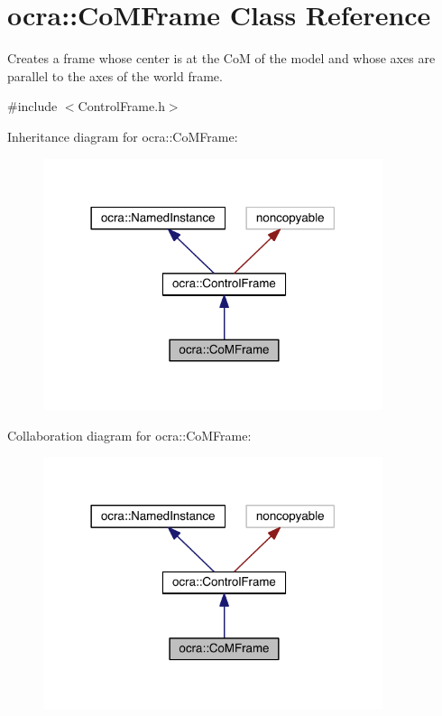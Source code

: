 \hypertarget{classocra_1_1CoMFrame}{}\section{ocra\+:\+:Co\+M\+Frame Class Reference}
\label{classocra_1_1CoMFrame}


Creates a frame whose center is at the CoM of the model and whose axes are parallel to the axes of the world frame.  




{\ttfamily \#include $<$Control\+Frame.\+h$>$}



Inheritance diagram for ocra\+:\+:Co\+M\+Frame\+:\nopagebreak
\begin{figure}[H]
\begin{center}
\leavevmode
\includegraphics[width=282pt]{d3/d86/classocra_1_1CoMFrame__inherit__graph}
\end{center}
\end{figure}


Collaboration diagram for ocra\+:\+:Co\+M\+Frame\+:\nopagebreak
\begin{figure}[H]
\begin{center}
\leavevmode
\includegraphics[width=282pt]{d5/de9/classocra_1_1CoMFrame__coll__graph}
\end{center}
\end{figure}
